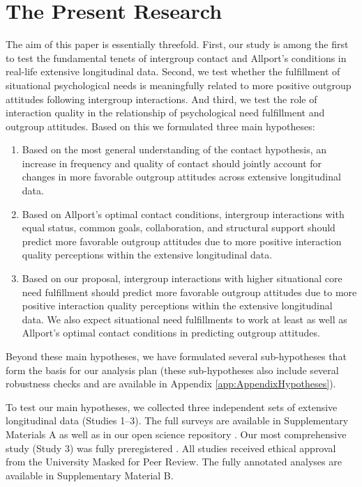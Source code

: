 \documentclass[man, 12pt, a4paper, mask]{apa7}
\theoremstyle{break}
\theoremstyle{plain}
\begin{document}
\section{The Present Research}
The aim of this paper is essentially threefold. First, our study is among the first to test the fundamental tenets of intergroup contact and Allport's conditions in real-life extensive longitudinal data. Second, we test whether the fulfillment of situational psychological needs is meaningfully related to more positive outgroup attitudes following intergroup interactions. And third, we test the role of interaction quality in  the relationship of psychological need fulfillment and outgroup attitudes. Based on this we formulated three main hypotheses:
\begin{enumerate}[label=H\arabic*:]
    \item Based on the most general understanding of the contact hypothesis, an increase in frequency and quality of contact should jointly account for changes in more favorable outgroup attitudes across extensive longitudinal data.
    \item Based on Allport’s optimal contact conditions, intergroup interactions with equal status, common goals, collaboration, and structural support should predict more favorable outgroup attitudes due to more positive interaction quality perceptions within the extensive longitudinal data.
    \item Based on our proposal, intergroup interactions with higher situational core need fulfillment should predict more favorable outgroup attitudes due to more positive interaction quality perceptions within the extensive longitudinal data. We also expect situational need fulfillments to work at least as well as Allport's optimal contact conditions in predicting outgroup attitudes.
\end{enumerate}
Beyond these main hypotheses, we have formulated several sub-hypotheses that form the basis for our analysis plan (these sub-hypotheses also include several robustness checks and are available in Appendix \ref{app:AppendixHypotheses}). 

To test our main hypotheses, we collected three independent sets of extensive longitudinal data (Studies 1–3). The full surveys are available in Supplementary Materials A as well as in our open science repository \citep[including a complete codebook, see][]{KreienkampMasked2022a}. Our most comprehensive study (Study 3) was fully preregistered  \citep[available at][]{KreienkampMasked2021f}. All studies received ethical approval from the University Masked for Peer Review. The fully annotated analyses are available in Supplementary Material B. 
\end{document}
